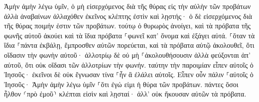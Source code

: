 \documentclass{openreader}
\begin{document}
Ἀμὴν ἀμὴν λέγω ὑμῖν, ὁ μὴ εἰσερχόμενος διὰ τῆς θύρας εἰς τὴν αὐλὴν τῶν προβάτων ἀλλὰ ἀναβαίνων ἀλλαχόθεν ἐκεῖνος κλέπτης ἐστὶν καὶ λῃστής· 
ὁ δὲ εἰσερχόμενος διὰ τῆς θύρας ποιμήν ἐστιν τῶν προβάτων. 
τούτῳ ὁ θυρωρὸς ἀνοίγει, καὶ τὰ πρόβατα τῆς φωνῆς αὐτοῦ ἀκούει καὶ τὰ ἴδια πρόβατα ⸀φωνεῖ κατ’ ὄνομα καὶ ἐξάγει αὐτά. 
⸀ὅταν τὰ ἴδια ⸀πάντα ἐκβάλῃ, ἔμπροσθεν αὐτῶν πορεύεται, καὶ τὰ πρόβατα αὐτῷ ἀκολουθεῖ, ὅτι οἴδασιν τὴν φωνὴν αὐτοῦ· 
ἀλλοτρίῳ δὲ οὐ μὴ ⸀ἀκολουθήσουσιν ἀλλὰ φεύξονται ἀπ’ αὐτοῦ, ὅτι οὐκ οἴδασι τῶν ἀλλοτρίων τὴν φωνήν. 
ταύτην τὴν παροιμίαν εἶπεν αὐτοῖς ὁ Ἰησοῦς· ἐκεῖνοι δὲ οὐκ ἔγνωσαν τίνα ⸀ἦν ἃ ἐλάλει αὐτοῖς. 
Εἶπεν οὖν πάλιν ⸀αὐτοῖς ὁ Ἰησοῦς· Ἀμὴν ἀμὴν λέγω ὑμῖν ⸀ὅτι ἐγώ εἰμι ἡ θύρα τῶν προβάτων. 
πάντες ὅσοι ἦλθον ⸂πρὸ ἐμοῦ⸃ κλέπται εἰσὶν καὶ λῃσταί· ἀλλ’ οὐκ ἤκουσαν αὐτῶν τὰ πρόβατα. 
\end{document}
